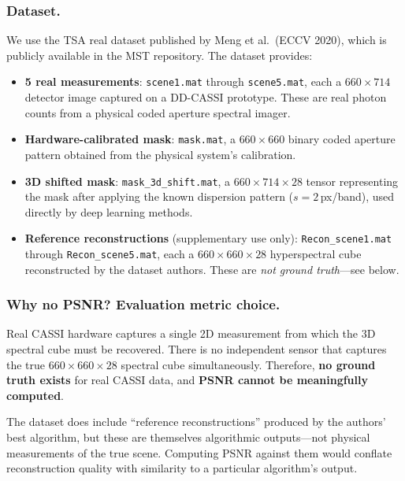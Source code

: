 \documentclass[runningheads]{llncs}
\begin{document}
\subsubsection{Dataset.}
We use the TSA real dataset published by Meng et al.\ (ECCV 2020), which is publicly available in the MST repository.
The dataset provides:
\begin{itemize}
    \item \textbf{5 real measurements}: \texttt{scene1.mat} through \texttt{scene5.mat}, each a $660 \times 714$ detector image captured on a DD-CASSI prototype. These are real photon counts from a physical coded aperture spectral imager.
    \item \textbf{Hardware-calibrated mask}: \texttt{mask.mat}, a $660 \times 660$ binary coded aperture pattern obtained from the physical system's calibration.
    \item \textbf{3D shifted mask}: \texttt{mask\_3d\_shift.mat}, a $660 \times 714 \times 28$ tensor representing the mask after applying the known dispersion pattern ($s{=}2$\,px/band), used directly by deep learning methods.
    \item \textbf{Reference reconstructions} (supplementary use only): \texttt{Recon\_scene1.mat} through \texttt{Recon\_scene5.mat}, each a $660 \times 660 \times 28$ hyperspectral cube reconstructed by the dataset authors. These are \emph{not ground truth}---see below.
\end{itemize}

\subsubsection{Why no PSNR? Evaluation metric choice.}
Real CASSI hardware captures a single 2D measurement from which the 3D spectral cube must be recovered.
There is no independent sensor that captures the true $660 \times 660 \times 28$ spectral cube simultaneously.
Therefore, \textbf{no ground truth exists} for real CASSI data, and \textbf{PSNR cannot be meaningfully computed}.

The dataset does include ``reference reconstructions'' produced by the authors' best algorithm, but these are themselves algorithmic outputs---not physical measurements of the true scene.
Computing PSNR against them would conflate reconstruction quality with similarity to a particular algorithm's output.
\end{document}
